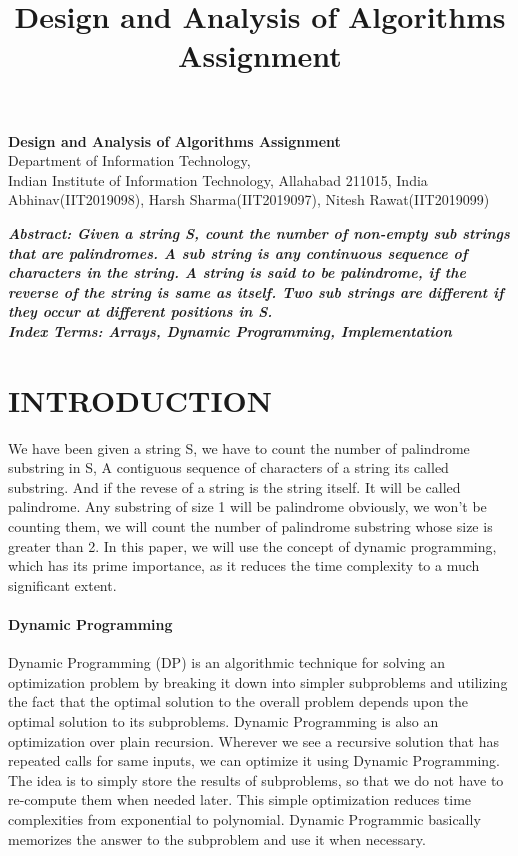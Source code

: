 \documentclass[10pt]{article}
\author{}
\title{\Large{Design and Analysis of Algorithms Assignment}}
\begin{document}
	
	\begin{center}
		{\Large \textbf{Design and Analysis of Algorithms Assignment}}\\
		\vspace{1em}
		{\large Department of Information Technology,}\\
		\vspace{1em}
		\large{Indian Institute of Information Technology, Allahabad 211015, India}\\
		\vspace{1em}
		\large{Abhinav(IIT2019098), Harsh Sharma(IIT2019097), Nitesh Rawat(IIT2019099)}
		\vspace{2.5em}
		
	\end{center}
	
\begin{multicols*}{2}

    \textbf{\emph{{Abstract}: Given a string S, count the number of non-empty sub strings that are palindromes. A sub string is any continuous sequence of characters in the string. A string is said to be palindrome, if the reverse of the string is same as itself. Two sub strings are different if they occur at different positions in S.}}\\
	
	\textbf{\emph{{Index Terms}: Arrays, Dynamic Programming, Implementation\\}}


\section*{INTRODUCTION}

We have been given a string S, we have to count the number of palindrome substring in S, A contiguous sequence of characters of a string its called substring. And if the revese of a string is the string itself. It will be called palindrome. Any substring of size 1 will be palindrome obviously, we won't be counting them, we will count the number of palindrome substring whose size is greater than 2. In this paper, we will use the concept of dynamic programming, which has its prime importance, as it reduces the time complexity to a much significant extent.

\paragraph{Dynamic Programming}
Dynamic Programming (DP) is an algorithmic technique for solving an optimization problem by breaking it down into simpler subproblems and utilizing the fact that the optimal solution to the overall problem depends upon the optimal solution to its subproblems. Dynamic Programming is also an optimization over plain recursion. Wherever we see a recursive solution that has repeated calls for same inputs, we can optimize it using Dynamic Programming. The idea is to simply store the results of subproblems, so that we do not have to re-compute them when needed later. This simple optimization reduces time complexities from exponential to polynomial. Dynamic Programmic basically memorizes the answer to the subproblem and use it when necessary.


\end{multicols*}
\end{document}
